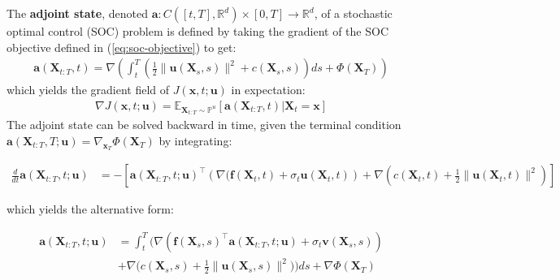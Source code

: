 \documentclass{article}
\begin{document}
\begin{definition}\label{def:adjoint-state}
    The \textbf{adjoint state}, denoted $\boldsymbol{a}:C([t,T], \mathbb{R}^d)\times[0,T]\to \mathbb{R}^d$, of a stochastic optimal control (SOC) problem is defined by taking the gradient of the SOC objective defined in (\ref{eq:soc-objective}) to get: 
    \begin{align}
        \boldsymbol{a}(\boldsymbol{X}_{t:T},t)=\nabla \left(\int_t^T\left(\frac{1}{2}\|\boldsymbol{u}(\boldsymbol{X}_s,s)\|^2+c(\boldsymbol{X}_s,s)\right)ds+\Phi(\boldsymbol{X}_T)\right)
    \end{align}
    which yields the gradient field of $J(\boldsymbol{x},t;\boldsymbol{u})$ in expectation:
    \begin{align}
        \nabla J(\boldsymbol{x},t;\boldsymbol{u})=\mathbb{E}_{\boldsymbol{X}_{t:T}\sim \mathbb{P}^u}\left[\boldsymbol{a}(\boldsymbol{X}_{t:T},t)|\boldsymbol{X}_t=\boldsymbol{x}\right]\label{eq:adjoint-state-2}
    \end{align}
    The adjoint state can be solved backward in time, given the terminal condition $\boldsymbol{a}(\boldsymbol{X}_{t:T}, T;\boldsymbol{u})=\nabla_{\boldsymbol{x}_T}\Phi(\boldsymbol{X}_T)$ by integrating:
    \begin{small}
    \begin{align}
        \frac{d}{dt}\boldsymbol{a}(\boldsymbol{X}_{t:T}, t; \boldsymbol{u})&=-\left[\boldsymbol{a}(\boldsymbol{X}_{t:T}, t; \boldsymbol{u})^\top\left(\nabla (\boldsymbol{f}(\boldsymbol{X}_t,t)+\sigma_t\boldsymbol{u}(\boldsymbol{X}_t,t)\right)+\nabla\left(c(\boldsymbol{X}_t,t)+\frac{1}{2}\|\boldsymbol{u}(\boldsymbol{X}_t,t)\|^2\right)\right]\label{eq:adjoint-derivative}
    \end{align}
    \end{small}
    which yields the alternative form:
    \begin{small}
    \begin{align}
        \boldsymbol{a}(\boldsymbol{X}_{t:T}, t;\boldsymbol{u})&=\int_t^T\bigg(\nabla (\boldsymbol{f}(\boldsymbol{X}_s,s)^\top\boldsymbol{a}(\boldsymbol{X}_{t:T}, t;\boldsymbol{u})+\sigma_t\boldsymbol{v}(\boldsymbol{X}_s,s))\nonumber\\
        &+\nabla \bigg(c(\boldsymbol{X}_s,s)+\frac{1}{2}\|\boldsymbol{u}(\boldsymbol{X}_s,s)\|^2\bigg)\bigg)ds+\nabla \Phi(\boldsymbol{X}_T)\label{eq:integral-adjoint-state}
    \end{align}
    \end{small}
\end{definition}
\end{document}
